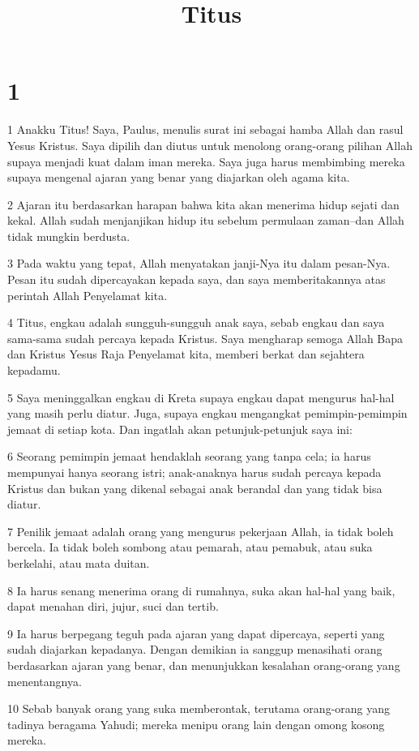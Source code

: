 

\title{Titus}


\chapter{1}

\par 1 Anakku Titus! Saya, Paulus, menulis surat ini sebagai hamba Allah dan rasul Yesus Kristus. Saya dipilih dan diutus untuk menolong orang-orang pilihan Allah supaya menjadi kuat dalam iman mereka. Saya juga harus membimbing mereka supaya mengenal ajaran yang benar yang diajarkan oleh agama kita.
\par 2 Ajaran itu berdasarkan harapan bahwa kita akan menerima hidup sejati dan kekal. Allah sudah menjanjikan hidup itu sebelum permulaan zaman--dan Allah tidak mungkin berdusta.
\par 3 Pada waktu yang tepat, Allah menyatakan janji-Nya itu dalam pesan-Nya. Pesan itu sudah dipercayakan kepada saya, dan saya memberitakannya atas perintah Allah Penyelamat kita.
\par 4 Titus, engkau adalah sungguh-sungguh anak saya, sebab engkau dan saya sama-sama sudah percaya kepada Kristus. Saya mengharap semoga Allah Bapa dan Kristus Yesus Raja Penyelamat kita, memberi berkat dan sejahtera kepadamu.
\par 5 Saya meninggalkan engkau di Kreta supaya engkau dapat mengurus hal-hal yang masih perlu diatur. Juga, supaya engkau mengangkat pemimpin-pemimpin jemaat di setiap kota. Dan ingatlah akan petunjuk-petunjuk saya ini:
\par 6 Seorang pemimpin jemaat hendaklah seorang yang tanpa cela; ia harus mempunyai hanya seorang istri; anak-anaknya harus sudah percaya kepada Kristus dan bukan yang dikenal sebagai anak berandal dan yang tidak bisa diatur.
\par 7 Penilik jemaat adalah orang yang mengurus pekerjaan Allah, ia tidak boleh bercela. Ia tidak boleh sombong atau pemarah, atau pemabuk, atau suka berkelahi, atau mata duitan.
\par 8 Ia harus senang menerima orang di rumahnya, suka akan hal-hal yang baik, dapat menahan diri, jujur, suci dan tertib.
\par 9 Ia harus berpegang teguh pada ajaran yang dapat dipercaya, seperti yang sudah diajarkan kepadanya. Dengan demikian ia sanggup menasihati orang berdasarkan ajaran yang benar, dan menunjukkan kesalahan orang-orang yang menentangnya.
\par 10 Sebab banyak orang yang suka memberontak, terutama orang-orang yang tadinya beragama Yahudi; mereka menipu orang lain dengan omong kosong mereka.
